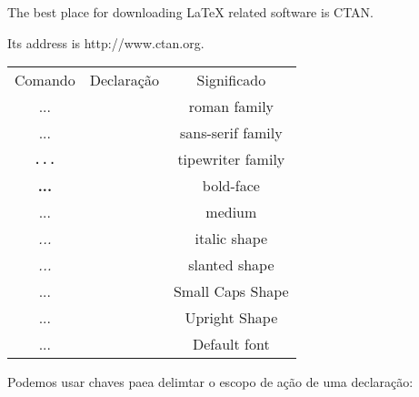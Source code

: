 \documentclass[a4paper, 12pt]{article}
\begin{document}
The best place for downloading LaTeX related software is CTAN.

Its address is \ttfamily http://www.ctan.org\rmfamily.


\begin{tabular}{ c c c }
    Comando         & Declaração  & Significado       \\
    \textrm{...}    & \rmfamily   & roman family      \\
    \textsf{...}    & \sffamily   & sans-serif family \\
    \texttt{...}    & \ttfamily   & tipewriter family \\
    \textbf{...}    & \bfseries   & bold-face         \\
    \textmd{...}    & \mdseries   & medium            \\
    \textit{...}    & \itshape    & italic shape      \\
    \textsl{...}    & \slshape    & slanted shape     \\
    \textsc{...}    & \scshape    & Small Caps Shape  \\
    \textup{...}    & \upshape    & Upright Shape     \\
    \textnormal{...}& \normalfont & Default font      \\
\end{tabular}

Podemos usar chaves paea delimtar o escopo de ação
de uma declaração:
\end{document}
